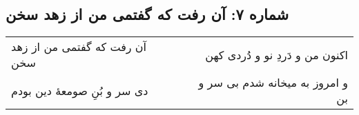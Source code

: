 \begin{center}
\section*{شماره ۷: آن رفت که گفتمی من از زهد سخن}
\label{sec:007}
\begin{longtable}{l p{0.5cm} r}
آن رفت که گفتمی من از زهد سخن
&&
اکنون من و دَردِ نو و دُردی کهن
\\
دی سر و بُنِ صومعهٔ دین بودم
&&
و امروز به میخانه شدم بی سر و بن
\\
\end{longtable}
\end{center}
